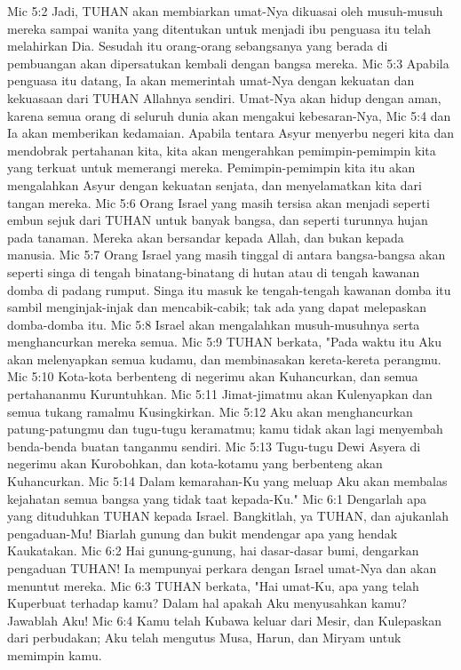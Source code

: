 Mic 5:2  Jadi, TUHAN akan membiarkan umat-Nya dikuasai oleh musuh-musuh mereka sampai wanita yang ditentukan untuk menjadi ibu penguasa itu telah melahirkan Dia. Sesudah itu orang-orang sebangsanya yang berada di pembuangan akan dipersatukan kembali dengan bangsa mereka.
Mic 5:3  Apabila penguasa itu datang, Ia akan memerintah umat-Nya dengan kekuatan dan kekuasaan dari TUHAN Allahnya sendiri. Umat-Nya akan hidup dengan aman, karena semua orang di seluruh dunia akan mengakui kebesaran-Nya,
Mic 5:4  dan Ia akan memberikan kedamaian. Apabila tentara Asyur menyerbu negeri kita dan mendobrak pertahanan kita, kita akan mengerahkan pemimpin-pemimpin kita yang terkuat untuk memerangi mereka. Pemimpin-pemimpin kita itu akan mengalahkan Asyur dengan kekuatan senjata, dan menyelamatkan kita dari tangan mereka.
Mic 5:6  Orang Israel yang masih tersisa akan menjadi seperti embun sejuk dari TUHAN untuk banyak bangsa, dan seperti turunnya hujan pada tanaman. Mereka akan bersandar kepada Allah, dan bukan kepada manusia.
Mic 5:7  Orang Israel yang masih tinggal di antara bangsa-bangsa akan seperti singa di tengah binatang-binatang di hutan atau di tengah kawanan domba di padang rumput. Singa itu masuk ke tengah-tengah kawanan domba itu sambil menginjak-injak dan mencabik-cabik; tak ada yang dapat melepaskan domba-domba itu.
Mic 5:8  Israel akan mengalahkan musuh-musuhnya serta menghancurkan mereka semua.
Mic 5:9  TUHAN berkata, "Pada waktu itu Aku akan melenyapkan semua kudamu, dan membinasakan kereta-kereta perangmu.
Mic 5:10  Kota-kota berbenteng di negerimu akan Kuhancurkan, dan semua pertahananmu Kuruntuhkan.
Mic 5:11  Jimat-jimatmu akan Kulenyapkan dan semua tukang ramalmu Kusingkirkan.
Mic 5:12  Aku akan menghancurkan patung-patungmu dan tugu-tugu keramatmu; kamu tidak akan lagi menyembah benda-benda buatan tanganmu sendiri.
Mic 5:13  Tugu-tugu Dewi Asyera di negerimu akan Kurobohkan, dan kota-kotamu yang berbenteng akan Kuhancurkan.
Mic 5:14  Dalam kemarahan-Ku yang meluap Aku akan membalas kejahatan semua bangsa yang tidak taat kepada-Ku."
Mic 6:1  Dengarlah apa yang dituduhkan TUHAN kepada Israel. Bangkitlah, ya TUHAN, dan ajukanlah pengaduan-Mu! Biarlah gunung dan bukit mendengar apa yang hendak Kaukatakan.
Mic 6:2  Hai gunung-gunung, hai dasar-dasar bumi, dengarkan pengaduan TUHAN! Ia mempunyai perkara dengan Israel umat-Nya dan akan menuntut mereka.
Mic 6:3  TUHAN berkata, "Hai umat-Ku, apa yang telah Kuperbuat terhadap kamu? Dalam hal apakah Aku menyusahkan kamu? Jawablah Aku!
Mic 6:4  Kamu telah Kubawa keluar dari Mesir, dan Kulepaskan dari perbudakan; Aku telah mengutus Musa, Harun, dan Miryam untuk memimpin kamu.
